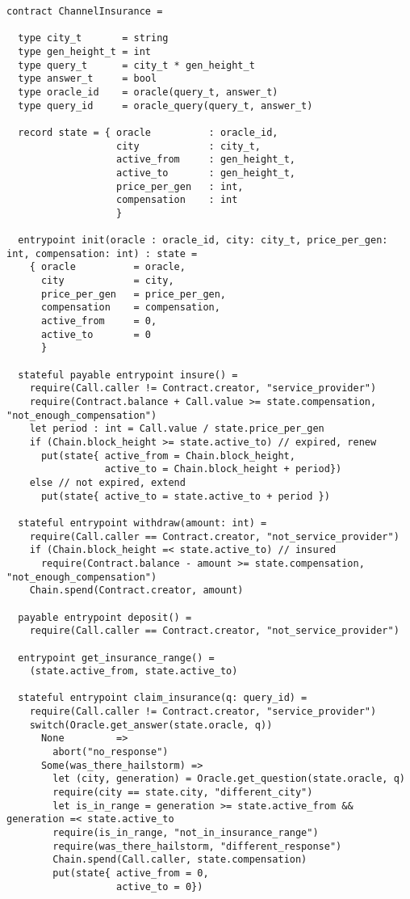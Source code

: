\begin{verbatim}
contract ChannelInsurance =

  type city_t       = string
  type gen_height_t = int
  type query_t      = city_t * gen_height_t
  type answer_t     = bool
  type oracle_id    = oracle(query_t, answer_t)
  type query_id     = oracle_query(query_t, answer_t)

  record state = { oracle          : oracle_id,
                   city            : city_t,
                   active_from     : gen_height_t,
                   active_to       : gen_height_t,
                   price_per_gen   : int,
                   compensation    : int
                   }

  entrypoint init(oracle : oracle_id, city: city_t, price_per_gen: int, compensation: int) : state =
    { oracle          = oracle,
      city            = city,
      price_per_gen   = price_per_gen,
      compensation    = compensation,
      active_from     = 0,
      active_to       = 0
      }

  stateful payable entrypoint insure() =
    require(Call.caller != Contract.creator, "service_provider")
    require(Contract.balance + Call.value >= state.compensation, "not_enough_compensation")
    let period : int = Call.value / state.price_per_gen
    if (Chain.block_height >= state.active_to) // expired, renew
      put(state{ active_from = Chain.block_height,
                 active_to = Chain.block_height + period})
    else // not expired, extend
      put(state{ active_to = state.active_to + period })

  stateful entrypoint withdraw(amount: int) =
    require(Call.caller == Contract.creator, "not_service_provider")
    if (Chain.block_height =< state.active_to) // insured
      require(Contract.balance - amount >= state.compensation, "not_enough_compensation")
    Chain.spend(Contract.creator, amount)

  payable entrypoint deposit() =
    require(Call.caller == Contract.creator, "not_service_provider")

  entrypoint get_insurance_range() =
    (state.active_from, state.active_to)

  stateful entrypoint claim_insurance(q: query_id) =
    require(Call.caller != Contract.creator, "service_provider")
    switch(Oracle.get_answer(state.oracle, q))
      None         =>
        abort("no_response")
      Some(was_there_hailstorm) =>
        let (city, generation) = Oracle.get_question(state.oracle, q)
        require(city == state.city, "different_city")
        let is_in_range = generation >= state.active_from && generation =< state.active_to
        require(is_in_range, "not_in_insurance_range")
        require(was_there_hailstorm, "different_response")
        Chain.spend(Call.caller, state.compensation)
        put(state{ active_from = 0,
                   active_to = 0})

\end{verbatim}

